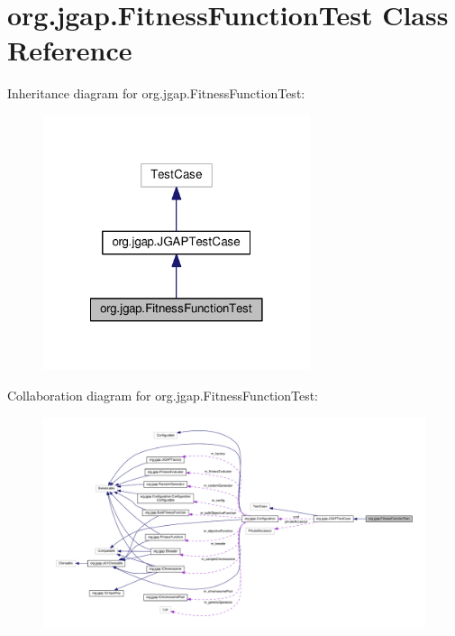 \hypertarget{classorg_1_1jgap_1_1_fitness_function_test}{\section{org.\-jgap.\-Fitness\-Function\-Test Class Reference}
\label{classorg_1_1jgap_1_1_fitness_function_test}
}


Inheritance diagram for org.\-jgap.\-Fitness\-Function\-Test\-:
\nopagebreak
\begin{figure}[H]
\begin{center}
\leavevmode
\includegraphics[width=222pt]{classorg_1_1jgap_1_1_fitness_function_test__inherit__graph}
\end{center}
\end{figure}


Collaboration diagram for org.\-jgap.\-Fitness\-Function\-Test\-:
\nopagebreak
\begin{figure}[H]
\begin{center}
\leavevmode
\includegraphics[width=350pt]{classorg_1_1jgap_1_1_fitness_function_test__coll__graph}
\end{center}
\end{figure}
